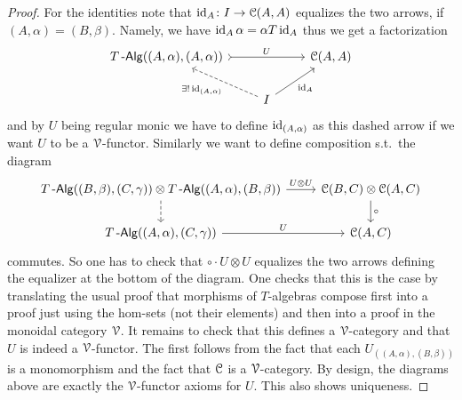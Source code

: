 \documentclass[a4paper,11pt,oneside,openany]{scrbook}
\begin{document}
\begin{proof}
	For the identities note that $\operatorname{id}_A\colon I\to\operatorname{\mathcal{C}}(A,A)$ equalizes the two arrows, if $(A,\alpha)=(B,\beta)$. Namely, we have $\operatorname{id}_A\alpha=\alpha T\operatorname{id}_A$ thus we get a factorization
	\[
		\begin{tikzcd}
			T\Alg((A,\alpha),(A,\alpha)) \arrow[rr, tail, "U"] & & \C(A,A)\\
			&  I \ar[ul, dashed, "\exists!\id_{(A,\alpha)}"]\ar[ur, "\id_A"']
		\end{tikzcd}
	\]
	and by $U$ being regular monic we have to define $\operatorname{id}_{(A,\alpha)}$ as this dashed arrow if we want $U$ to be a $\operatorname{\mathcal{V}}$-functor. Similarly we want to define composition s.t.\ the diagram
	\[
		\begin{tikzcd}
			T\Alg((B,\beta),(C,\gamma))\otimes T\Alg((A,\alpha),(B,\beta))\ar[r, "U\otimes U"]\ar[d, dashed]
			& \C(B,C)\otimes\C(A,C)\ar[d, "\circ"] \\
			T\Alg((A,\alpha),(C,\gamma))\ar[r, "U"]
			& \C(A,C)
		\end{tikzcd}
	\]
	commutes. So one has to check that $\circ\cdot U\otimes U$ equalizes the two arrows defining the equalizer at the bottom of the diagram. One checks that this is the case by translating the usual proof that morphisms of $T$-algebras compose first into a proof just using the hom-sets (not their elements) and then into a proof in the monoidal category $\operatorname{\mathcal{V}}$. It remains to check that this defines a $\operatorname{\mathcal{V}}$-category and that $U$ is indeed a $\operatorname{\mathcal{V}}$-functor. The first follows from the fact that each $U_{((A,\alpha),(B,\beta))}$ is a monomorphism and the fact that $\operatorname{\mathcal{C}}$ is a $\operatorname{\mathcal{V}}$-category. By design, the diagrams above are exactly the $\operatorname{\mathcal{V}}$-functor axioms for $U$. This also shows uniqueness.
\end{proof}
\end{document}
